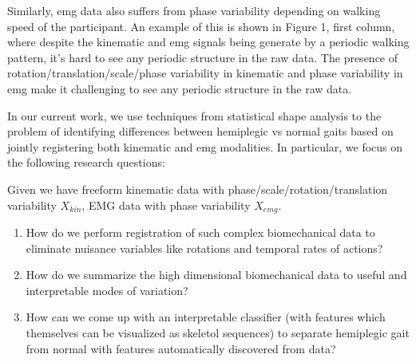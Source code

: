 \documentclass{article}
\begin{document}
Similarly, emg data also suffers from phase variability depending on walking speed of the participant. An example of this is shown in Figure 1, first column, where despite the kinematic and emg signals being generate by a periodic walking pattern, it's hard to see any periodic structure in the raw data. The presence of rotation/translation/scale/phase variability in kinematic and phase variability in emg make it challenging to see any periodic structure in the raw data.


In our current work, we use techniques from statistical shape analysis to the problem of identifying differences between hemiplegic vs normal gaits based on jointly registering both kinematic and emg modalities. In particular, we focus on the following research questions:

Given we have freeform kinematic data with phase/scale/rotation/translation variability $X_{kin}$, EMG data with phase variability $X_{emg}$.

\begin{enumerate}
    \item How do we perform registration of such complex biomechanical data to eliminate nuisance variables like rotations and temporal rates of actions?
    \item How do we summarize the high dimensional biomechanical data to useful and interpretable modes of variation?
    \item How can we come up with an interpretable classifier (with features which themselves can be visualized as skeletol sequences) to separate hemiplegic gait from normal with features automatically discovered from data?
\end{enumerate}
\end{document}
